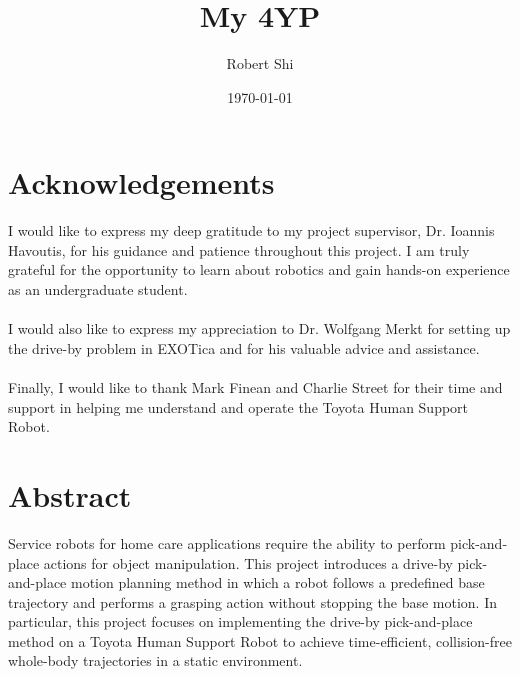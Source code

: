 \documentclass[12pt]{article}
\title{My 4YP}
\author{Robert Shi}
\date{\today}
\begin{document}
\maketitle
\newpage
\section{Acknowledgements}
    I would like to express my deep gratitude to my project supervisor, Dr. Ioannis Havoutis, for his guidance and patience throughout this project. I am truly grateful for the opportunity to learn about robotics and gain hands-on experience as an undergraduate student.\\
    \hspace*{\fill}\\
    I would also like to express my appreciation to Dr. Wolfgang Merkt for setting up the drive-by problem in EXOTica and for his valuable advice and assistance.\\
    \hspace*{\fill}\\
    Finally, I would like to thank Mark Finean and Charlie Street for their time and support in helping me understand and operate the Toyota Human Support Robot.
\newpage


\section{Abstract}
    Service robots for home care applications require the ability to perform pick-and-place actions for object manipulation. This project introduces a drive-by pick-and-place motion planning method in which a robot follows a predefined base trajectory and performs a grasping action without stopping the base motion. In particular, this project focuses on implementing the drive-by pick-and-place method on a Toyota Human Support Robot to achieve time-efficient, collision-free whole-body trajectories in a static environment.
\newpage
\tableofcontents
\newpage
\end{document}
